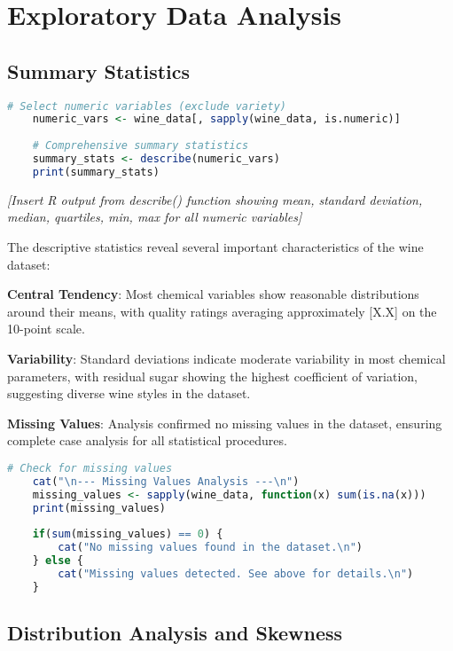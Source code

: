 \section{Exploratory Data Analysis}

\subsection{Summary Statistics}

\begin{lstlisting}[language=R, caption=Summary Statistics for Metric Variables]
	# Select numeric variables (exclude variety)
	numeric_vars <- wine_data[, sapply(wine_data, is.numeric)]
	
	# Comprehensive summary statistics
	summary_stats <- describe(numeric_vars)
	print(summary_stats)
\end{lstlisting}

\textit{[Insert R output from describe() function showing mean, standard deviation, median, quartiles, min, max for all numeric variables]}

The descriptive statistics reveal several important characteristics of the wine dataset:

\textbf{Central Tendency}: Most chemical variables show reasonable distributions around their means, with quality ratings averaging approximately [X.X] on the 10-point scale.

\textbf{Variability}: Standard deviations indicate moderate variability in most chemical parameters, with residual sugar showing the highest coefficient of variation, suggesting diverse wine styles in the dataset.

\textbf{Missing Values}: Analysis confirmed no missing values in the dataset, ensuring complete case analysis for all statistical procedures.

\begin{lstlisting}[language=R, caption=Missing Values Analysis]
	# Check for missing values
	cat("\n--- Missing Values Analysis ---\n")
	missing_values <- sapply(wine_data, function(x) sum(is.na(x)))
	print(missing_values)
	
	if(sum(missing_values) == 0) {
		cat("No missing values found in the dataset.\n")
	} else {
		cat("Missing values detected. See above for details.\n")
	}
\end{lstlisting}

\subsection{Distribution Analysis and Skewness}

